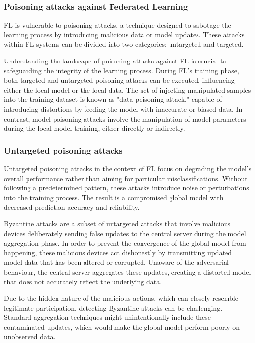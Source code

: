 \subsubsection{Poisoning attacks against Federated Learning}
FL is vulnerable to poisoning attacks, a technique designed to sabotage the learning process by introducing malicious data or model updates. These attacks within FL systems can be divided into two categories: untargeted and targeted.

Understanding the landscape of poisoning attacks against FL is crucial to safeguarding the integrity of the learning process. During FL's training phase, both targeted and untargeted poisoning attacks can be executed, influencing either the local model or the local data. The act of injecting manipulated samples into the training dataset is known as "data poisoning attack," capable of introducing distortions by feeding the model with inaccurate or biased data. In contrast, model poisoning attacks involve the manipulation of model parameters during the local model training, either directly or indirectly.

\subsubsection{Untargeted poisoning attacks}\label{sec:untargeted}
Untargeted poisoning attacks in the context of FL focus on degrading the model's overall performance rather than aiming for particular misclassifications. Without following a predetermined pattern, these attacks introduce noise or perturbations into the training process. The result is a compromised global model with decreased prediction accuracy and reliability.

Byzantine attacks are a subset of untargeted attacks that involve malicious devices deliberately sending false updates to the central server during the model aggregation phase. In order to prevent the convergence of the global model from happening, these malicious devices act dishonestly by transmitting updated model data that has been altered or corrupted. Unaware of the adversarial behaviour, the central server aggregates these updates, creating a distorted model that does not accurately reflect the underlying data.

Due to the hidden nature of the malicious actions, which can closely resemble legitimate participation, detecting Byzantine attacks can be challenging.  Standard aggregation techniques might unintentionally include these contaminated updates, which would make the global model perform poorly on unobserved data.

